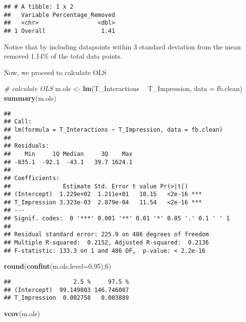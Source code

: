 \documentclass[
]{article}
\newenvironment{Shaded}{\begin{snugshade}}{\end{snugshade}}
\newcommand{\CommentTok}[1]{\textcolor[rgb]{0.56,0.35,0.01}{\textit{#1}}}
\newcommand{\DataTypeTok}[1]{\textcolor[rgb]{0.13,0.29,0.53}{#1}}
\newcommand{\DecValTok}[1]{\textcolor[rgb]{0.00,0.00,0.81}{#1}}
\newcommand{\FloatTok}[1]{\textcolor[rgb]{0.00,0.00,0.81}{#1}}
\newcommand{\KeywordTok}[1]{\textcolor[rgb]{0.13,0.29,0.53}{\textbf{#1}}}
\newcommand{\NormalTok}[1]{#1}
\newcommand{\OperatorTok}[1]{\textcolor[rgb]{0.81,0.36,0.00}{\textbf{#1}}}
\newcommand{\StringTok}[1]{\textcolor[rgb]{0.31,0.60,0.02}{#1}}
\begin{document}
\begin{verbatim}
## # A tibble: 1 x 2
##   Variable Percentage_Removed
##   <chr>                 <dbl>
## 1 Overall                1.41
\end{verbatim}

Notice that by including datapoints within 3 standard deviation from the
mean removed 1.14\% of the total data points.

Now, we proceed to calculate OLS

\begin{Shaded}
\begin{Highlighting}[]
\CommentTok{# calculate OLS}
\NormalTok{m.ols <-}\StringTok{ }\KeywordTok{lm}\NormalTok{(T_Interactions }\OperatorTok{~}\StringTok{ }\NormalTok{T_Impression, }\DataTypeTok{data =}\NormalTok{ fb.clean)}
\KeywordTok{summary}\NormalTok{(m.ols)}
\end{Highlighting}
\end{Shaded}

\begin{verbatim}
## 
## Call:
## lm(formula = T_Interactions ~ T_Impression, data = fb.clean)
## 
## Residuals:
##    Min     1Q Median     3Q    Max 
## -835.1  -92.1  -43.1   39.7 1624.1 
## 
## Coefficients:
##               Estimate Std. Error t value Pr(>|t|)    
## (Intercept)  1.229e+02  1.211e+01   10.15   <2e-16 ***
## T_Impression 3.323e-03  2.879e-04   11.54   <2e-16 ***
## ---
## Signif. codes:  0 '***' 0.001 '**' 0.01 '*' 0.05 '.' 0.1 ' ' 1
## 
## Residual standard error: 225.9 on 486 degrees of freedom
## Multiple R-squared:  0.2152, Adjusted R-squared:  0.2136 
## F-statistic: 133.3 on 1 and 486 DF,  p-value: < 2.2e-16
\end{verbatim}

\begin{Shaded}
\begin{Highlighting}[]
\KeywordTok{round}\NormalTok{(}\KeywordTok{confint}\NormalTok{(m.ols,}\DataTypeTok{level=}\FloatTok{0.95}\NormalTok{),}\DecValTok{6}\NormalTok{)}
\end{Highlighting}
\end{Shaded}

\begin{verbatim}
##                  2.5 %     97.5 %
## (Intercept)  99.149803 146.746087
## T_Impression  0.002758   0.003889
\end{verbatim}

\begin{Shaded}
\begin{Highlighting}[]
\KeywordTok{vcov}\NormalTok{(m.ols)}
\end{Highlighting}
\end{Shaded}
\end{document}

